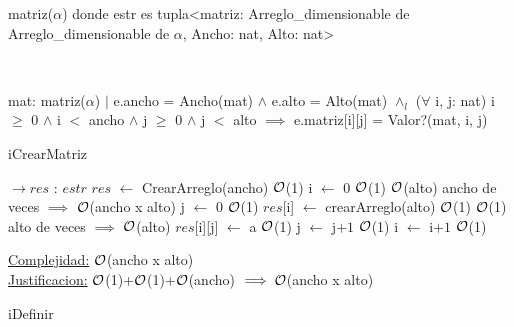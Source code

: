 \begin{Representacion}
	
	
	\begin{Estructura}{matriz($\alpha$)}
		donde estr es tupla<matriz: Arreglo\_dimensionable de Arreglo\_dimensionable de $\alpha$, Ancho: nat, Alto: nat>
	\end{Estructura}
	
	
	~	
	
	{mat: matriz($\alpha$) $|$ e.ancho = Ancho(mat) $\land$ e.alto = Alto(mat) $\land _l$ ($\forall$ i, j: nat) i $\geq$ $0$ $\land$ i $<$ ancho $\land$ j $\geq$ $0$ $\land$ j $<$ alto $\implies$ e.matriz[i][j] = Valor?(mat, i, j) }
	
\begin{Algoritmos}
	
	\begin{algorithm}[H]
		\caption{iCrearMatriz}
		
		\begin{algorithmic}[1]
			 $\to res$ : $estr$
			\State $res$ $\leftarrow$ CrearArreglo(ancho) \Comment $\mathcal{O}$(1)
			\State i $\leftarrow$ $0$ \Comment $\mathcal{O}$(1)
			 \Comment $\mathcal{O}$(alto) ancho de veces $\implies$ $\mathcal{O}$(ancho x alto)
				\State j $\leftarrow$ $0$ \Comment $\mathcal{O}$(1)
				\State $res$[i] $\leftarrow$ crearArreglo(alto) \Comment $\mathcal{O}$(1)
				 \Comment $\mathcal{O}$(1) alto de veces $\implies$  $\mathcal{O}$(alto)
					\State $res$[i][j] $\leftarrow$ a \Comment $\mathcal{O}$(1)
					\State j $\leftarrow$ j$+1$ \Comment $\mathcal{O}$(1)
				\EndWhile
				\State i $\leftarrow$ i$+1$ \Comment $\mathcal{O}$(1)
			\EndWhile
			\EndProcedure
		\end{algorithmic}
		\underline{Complejidad:} $\mathcal{O}$(ancho x alto)
		\\
		\underline{Justificacion:} $\mathcal{O}$(1)+$\mathcal{O}$(1)+$\mathcal{O}$(ancho) $\implies \mathcal{O}$(ancho x alto)
		
	\end{algorithm}
	
	\begin{algorithm}[H]
		\caption{iDefinir}
		

\end{algorithm}
\end{Algoritmos}
\end{Representacion}
